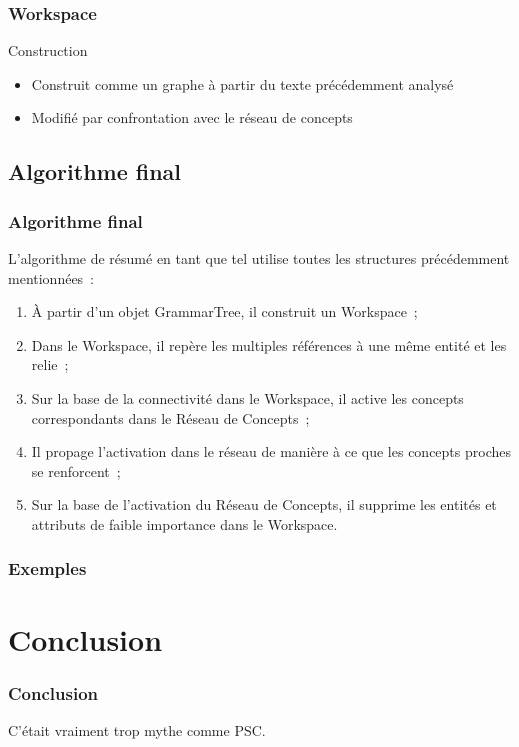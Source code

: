 \documentclass[12pt, handout]{beamer}
\begin{document}
\begin{frame}
  \frametitle{Workspace}
 
  \begin{block}{Construction}
    \begin{itemize}
      \item Construit comme un graphe à partir du texte précédemment analysé
      \item Modifié par confrontation avec le réseau de concepts
    \end{itemize}
  \end{block}
 
\end{frame}

\subsection{Algorithme final}

\begin{frame}
 \frametitle{Algorithme final}
 L'algorithme de résumé en tant que tel utilise toutes les structures précédemment mentionnées~:
 \begin{enumerate}
  \item À partir d'un objet GrammarTree, il construit un Workspace~;
  \item Dans le Workspace, il repère les multiples références à une même entité et les relie~;
  \item Sur la base de la connectivité dans le Workspace, il active les concepts correspondants dans le Réseau de Concepts~;
  \item Il propage l'activation dans le réseau de manière à ce que les concepts proches se renforcent~;
  \item Sur la base de l'activation du Réseau de Concepts, il supprime les entités et attributs de faible importance dans le Workspace.
 \end{enumerate}
 
\end{frame}

\begin{frame}
 \frametitle{Exemples}
 
 
\end{frame}

\section{Conclusion}

\begin{frame}
 \frametitle{Conclusion}
 
C'était vraiment trop mythe comme PSC\@.
 
\end{frame}
\end{document}
